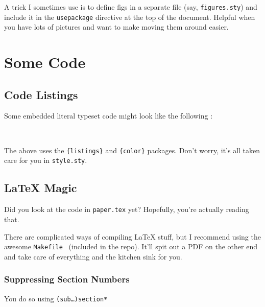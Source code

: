 \documentclass[letterpaper,twocolumn,10pt,final]{article}
\begin{document}
A trick I sometimes use is to define figs in a separate file (say, \texttt{figures.sty}) and include it in the \texttt{usepackage} directive at the top of the document. Helpful when you have lots of pictures and want to make moving them around easier.

\section{\label{sec:code}Some Code}

\subsection{\label{sec:code:py}Code Listings}

Some embedded literal typeset code might look like the following :

\texttt{
    \small
}

The above uses the \texttt{\{listings\}} and \texttt{\{color\}} packages. Don't worry, it's all taken care for you in \texttt{style.sty}.

\subsection{\label{sec:code:tex}LaTeX Magic}

Did you look at the code in \texttt{paper.tex} yet? Hopefully, you're actually reading that.

There are complicated ways of compiling LaTeX stuff, but I recommend using the awesome \texttt{Makefile}~\cite{latex-makefile} (included in the repo). It'll spit out a PDF on the other end and take care of everything and the kitchen sink for you.

\subsubsection*{Suppressing Section Numbers}

You do so using \texttt{(sub\ldots)section*}

{\footnotesize 
    
    }

\theendnotes
\end{document}
